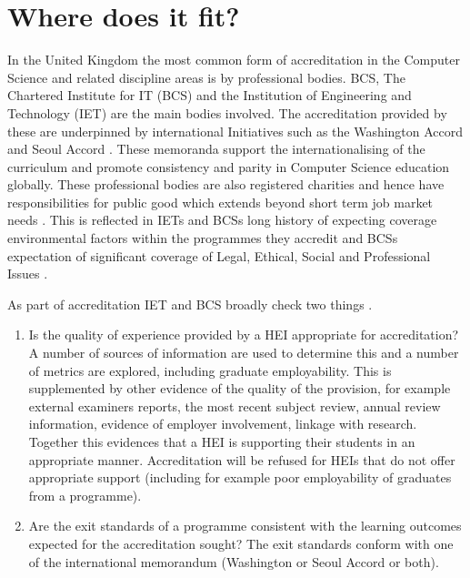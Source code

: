 \documentclass[sigconf]{acmart}
\begin{document}
\section {Where does it fit?	}

In the United Kingdom the most common form of accreditation in the Computer Science and related discipline areas is by professional bodies.  BCS, The Chartered Institute for IT (BCS) and the Institution of Engineering and Technology (IET) are the main bodies involved. The accreditation provided by these %
are underpinned by international Initiatives such as the Washington Accord \cite[for CEng]{Washington2019} and Seoul Accord \cite[for CITP]{Seoul2019}. These memoranda support the internationalising of the curriculum and promote consistency and parity in Computer Science education globally. These professional bodies are also registered charities and hence have responsibilities for public good which extends beyond short term job market needs \cite{Stensaker2006,Mutereko2017}. This is reflected in IETs and BCSs long history of expecting coverage environmental factors within the programmes they accredit and BCSs expectation of significant coverage of Legal, Ethical, Social and Professional Issues \cite{Brooke2018}. 

As part of accreditation IET and BCS broadly check two things \cite{BCS2018a, IET2019}. 

\begin{enumerate}
    \item Is the quality of experience provided by a HEI appropriate for accreditation?
    A number of sources of information are used to determine this and a number of metrics are explored, including graduate employability.  This is supplemented by other evidence of the quality of the provision, for example external examiners reports, the most recent subject review, annual review information, evidence of employer involvement, linkage with research. Together this evidences that a HEI is supporting their students in an appropriate manner. Accreditation will be refused for HEIs that do not offer appropriate support (including for example poor employability of graduates from a programme).  
    \item Are the exit standards of a programme consistent with the learning outcomes expected for the accreditation sought? The exit standards conform with one of the international memorandum (Washington or Seoul Accord or both). 
\end{enumerate}
\end{document}
